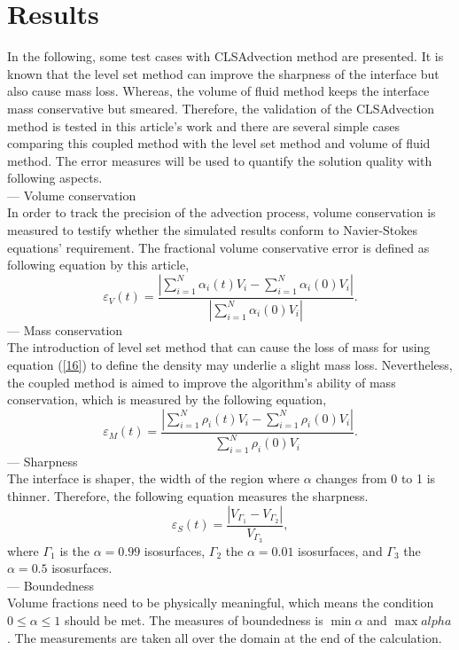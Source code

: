 \section{Results}
In the following, some test cases with CLSAdvection method are presented. It is known that the level set method can improve the sharpness of the interface but also cause mass loss. Whereas, the volume of fluid method keeps the interface mass conservative but smeared. Therefore, the validation of the CLSAdvection method is tested in this article's work and there are several simple cases comparing this coupled method with the level set method and volume of fluid method. The error measures will be used to quantify the solution quality with following aspects.\\
--- Volume conservation\\
In order to track the precision of the advection process, volume conservation is measured to testify whether the simulated results conform to Navier-Stokes equations' requirement. The fractional volume conservative error is defined as following equation by this article\cite{gopala2008volume},
\begin{equation}\label{28}
\varepsilon_{V}(t)=\frac{\left|\sum\limits^N_{i=1}\alpha_i(t)V_i-\sum\limits^N_{i=1}\alpha_i(0)V_i\right|}{\left|\sum\limits^N_{i=1}\alpha_{i}(0)V_i\right|}.
\end{equation}
--- Mass conservation\\
The introduction of level set method that can cause the loss of mass for using equation (\ref{16}) to define the density may underlie a slight mass loss. Nevertheless, the coupled method is aimed to improve the algorithm's ability of mass conservation, which is measured by the following equation,
\begin{equation}\label{29}
\varepsilon_{M}(t)=\frac{\left|\sum\limits^N_{i=1}\rho_i(t)V_i-\sum\limits_{i=1}^N\rho_i(0)V_i\right|}{\sum\limits^N_{i=1}\rho_i(0)V_i}.
\end{equation}
--- Sharpness\\
The interface is shaper, the width of the region where $\alpha$ changes from 0 to 1 is thinner. Therefore, the following equation measures the sharpness.
\begin{equation}\label{29}
\varepsilon_{S}(t)=\frac{\left|V_{\Gamma_1}-V_{\Gamma_2}\right|}{V_{\Gamma_3}},
\end{equation}
where $\Gamma_1$ is the $\alpha=0.99$ isosurfaces, $\Gamma_2$ the $\alpha=0.01$ isosurfaces, and $\Gamma_3$ the $\alpha=0.5$ isosurfaces.\\
--- Boundedness\\
Volume fractions need to be physically meaningful, which means the condition $0\leq\alpha\leq{1}$ should be met. The measures of boundedness is $\min{\alpha}$ and $\max{alpha}$. The measurements are taken all over the domain at the end of the calculation. 


